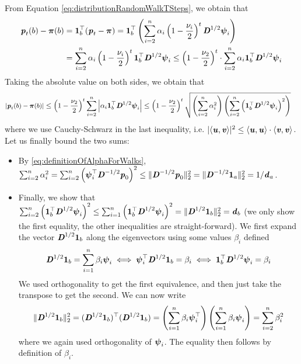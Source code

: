 From Equation \ref{eq:distributionRandomWalkTSteps}, we obtain that
\begin{align}\label{eq:piecewiseDistribution}
    \boldsymbol{\mathit{p}}_t(b) - \boldsymbol{\pi}(b) &= \boldsymbol{1}_b^\top(\boldsymbol{\mathit{p}}_t - \boldsymbol{\pi}) = \boldsymbol{1}_b^\top\left( \sum_{i=2}^n \alpha_i \left(1-\frac{\nu_i}{2}\right)^t \boldsymbol{\mathit{D}}^{1/2} \boldsymbol{\mathit{\psi}}_i \right)
    \\ & =   \sum_{i=2}^n \alpha_i \left(1-\frac{\nu_i}{2}\right)^t \boldsymbol{1}_b^\top\boldsymbol{\mathit{D}}^{1/2} \boldsymbol{\mathit{\psi}}_i
    \leq \left(1-\frac{\nu_2}{2}\right)^t \cdot \sum_{i=2}^n \alpha_i  \boldsymbol{1}_b^\top\boldsymbol{\mathit{D}}^{1/2} \boldsymbol{\mathit{\psi}}_i
\end{align}
Taking the absolute value on both sides, we obtain that
\begin{align*}\small
|\boldsymbol{\mathit{p}}_t(b) - \boldsymbol{\pi}(b)|
&\leq \left(1-\frac{\nu_2}{2}\right)^t\sum_{i=2}^n \left|\alpha_i  \boldsymbol{1}_b^\top\boldsymbol{\mathit{D}}^{1/2} \boldsymbol{\mathit{\psi}}_i \right|\leq \left(1-\frac{\nu_2}{2}\right)^t \sqrt{\left( \sum_{i=2}^n \alpha_i^2 \right) \left( \sum_{i=2}^n \left(\boldsymbol{1}_b^\top\boldsymbol{\mathit{D}}^{1/2} \boldsymbol{\mathit{\psi}}_i \right)^2 \right)}
\end{align*}
where we use Cauchy-Schwarz in the last inequality, i.e. $|\langle \boldsymbol{\mathit{u}}, \boldsymbol{\mathit{v}} \rangle|^2 \leq \langle \boldsymbol{\mathit{u}}, \boldsymbol{\mathit{u}} \rangle \cdot \langle \boldsymbol{\mathit{v}}, \boldsymbol{\mathit{v}} \rangle$. Let us finally bound the two sums:
\begin{itemize}
    \item By \ref{eq:definitionOfAlphaForWalks}, $\sum_{i=2}^n \alpha_i^2 = \sum_{i=2}^n \left(\boldsymbol{\mathit{\psi}}^\top_i \boldsymbol{\mathit{D}}^{-1/2}\boldsymbol{\mathit{p}}_0 \right)^2 \leq \|\boldsymbol{\mathit{D}}^{-1/2}\boldsymbol{\mathit{p}}_0\|_2^2 =  \|\boldsymbol{\mathit{D}}^{-1/2}\boldsymbol{1}_a\|_2^2 = 1/\boldsymbol{\mathit{d}}_a$.
    \item Finally, we show that $\sum_{i=2}^n \left(\boldsymbol{1}_b^\top\boldsymbol{\mathit{D}}^{1/2} \boldsymbol{\mathit{\psi}}_i \right)^2 \leq \sum_{i=1}^n \left(\boldsymbol{1}_b^\top\boldsymbol{\mathit{D}}^{1/2} \boldsymbol{\mathit{\psi}}_i \right)^2 = \|\boldsymbol{\mathit{D}}^{1/2}\boldsymbol{1}_b\|_2^2 = \boldsymbol{\mathit{d}}_b$ (we only show the first equality, the other inequalities are straight-forward). We first expand the vector $\boldsymbol{\mathit{D}}^{1/2}\boldsymbol{1}_b$ along the eigenvectors using some values $\beta_i$ defined
    \[
        \boldsymbol{\mathit{D}}^{1/2}\boldsymbol{1}_b = \sum_{i=1}^n \beta_i \boldsymbol{\mathit{\psi}}_i \iff  \boldsymbol{\mathit{\psi}}_i^\top \boldsymbol{\mathit{D}}^{1/2}\boldsymbol{1}_b = \beta_i \iff  \boldsymbol{1}_b^\top \boldsymbol{\mathit{D}}^{1/2}\boldsymbol{\mathit{\psi}}_i= \beta_i  
    \]
    We used orthogonality to get the first equivalence, and then just take the transpose to get the second. We can now write
    \[
    \|\boldsymbol{\mathit{D}}^{1/2}\boldsymbol{1}_b\|_2^2 = (\boldsymbol{\mathit{D}}^{1/2}\boldsymbol{1}_b)^{\top} (\boldsymbol{\mathit{D}}^{1/2}\boldsymbol{1}_b) = \left(\sum_{i=1}^n \beta_i \boldsymbol{\mathit{\psi}}_i^\top\right) \left(\sum_{i=1}^n \beta_i \boldsymbol{\mathit{\psi}}_i\right) = \sum_{i=2}^n \beta_i^2
    \]
    where we again used orthogonality of $\boldsymbol{\mathit{\psi}}_i$. The equality then follows by definition of $\beta_i$.
\end{itemize}

